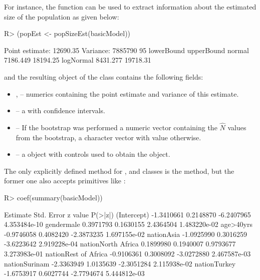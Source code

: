\documentclass[
]{jss}
\newcommand{\1}{\mathcal{I}} \newcommand{\bZero}{\boldsymbol{0}}
\begin{document}
For instance, the  function can be used to extract
information about the estimated size of the population as given below:

\begin{CodeChunk}
\begin{CodeInput}
R> (popEst <- popSizeEst(basicModel))
\end{CodeInput}
\begin{CodeOutput}
Point estimate: 12690.35
Variance: 7885790
95%
          lowerBound upperBound
normal      7186.449   18194.25
logNormal   8431.277   19718.31
\end{CodeOutput}
\end{CodeChunk}

and the resulting object  of the 
class contains the following fields:

\begin{itemize}
  \item {},  -- numerics containing the point estimate and variance of this estimate.
  \item {} -- a  with confidence intervals.
  \item {} -- If the bootstrap was performed a numeric vector containing the $\hat{N}$ values from the bootstrap, a character vector with value  otherwise.
  \item {} -- a  object with controls used to obtain the object.
\end{itemize}

The only explicitly defined method for ,
 and 
classes is the  method, but the former one also accepts
 primitives like :

\begin{CodeChunk}
\begin{CodeInput}
R> coef(summary(basicModel))
\end{CodeInput}
\begin{CodeOutput}
                       Estimate Std. Error    z value      P(>|z|)
(Intercept)          -1.3410661  0.2148870 -6.2407965 4.353484e-10
gendermale            0.3971793  0.1630155  2.4364504 1.483220e-02
age>40yrs            -0.9746058  0.4082420 -2.3873235 1.697155e-02
nationAsia           -1.0925990  0.3016259 -3.6223642 2.919228e-04
nationNorth Africa    0.1899980  0.1940007  0.9793677 3.273983e-01
nationRest of Africa -0.9106361  0.3008092 -3.0272880 2.467587e-03
nationSurinam        -2.3363949  1.0135639 -2.3051284 2.115938e-02
nationTurkey         -1.6753917  0.6027744 -2.7794674 5.444812e-03
\end{CodeOutput}
\end{CodeChunk}
\end{document}
